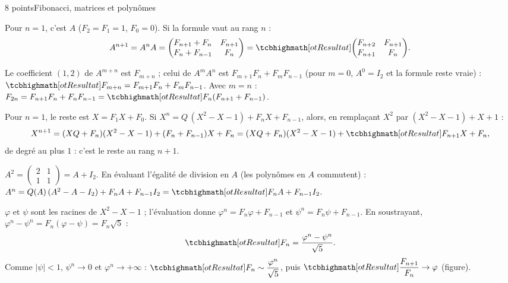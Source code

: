 \begin{corrigeEval}[Problème]{8 points}{Fibonacci, matrices et polynômes}
\begin{questions}
  \item Pour $n=1$, c'est $A$ ($F_2=F_1=1$, $F_0=0$). Si la formule vaut au
    rang $n$ :
    \[A^{n+1}=A^{n}A=\begin{pmatrix}F_{n+1}+F_n&F_{n+1}\\F_n+F_{n-1}&F_n\end{pmatrix}
      =\res{\begin{pmatrix}F_{n+2}&F_{n+1}\\F_{n+1}&F_n\end{pmatrix}}.\]
    \pts{1 pt}
  \item Le coefficient $(1,2)$ de $A^{m+n}$ est $F_{m+n}$ ; celui de
    $A^{m}A^{n}$ est $F_{m+1}F_n+F_mF_{n-1}$ (pour $m=0$, $A^{0}=I_2$ et la
    formule reste vraie) :
    $\res{F_{m+n}=F_{m+1}F_n+F_mF_{n-1}}$. Avec $m=n$ :
    $F_{2n}=F_{n+1}F_n+F_nF_{n-1}=\res{F_n(F_{n+1}+F_{n-1})}$. 
\end{questions}
\begin{questions}[start=3]
  \item Pour $n=1$, le reste est $X=F_1X+F_0$. Si
    $X^{n}=Q\,(X^{2}-X-1)+F_nX+F_{n-1}$, alors, en remplaçant $X^{2}$ par
    $(X^{2}-X-1)+X+1$ :
    \[X^{n+1}=(XQ+F_n)(X^{2}-X-1)+(F_n+F_{n-1})X+F_n
      =(XQ+F_n)(X^{2}-X-1)+\res{F_{n+1}X+F_n},\]
    de degré au plus $1$ : c'est le reste au rang $n+1$. 
  \item $A^{2}=\begin{pmatrix}2&1\\1&1\end{pmatrix}=A+I_2$. En évaluant
    l'égalité de division en $A$ (les polynômes en $A$ commutent) :
    $A^{n}=Q(A)\,(A^{2}-A-I_2)+F_nA+F_{n-1}I_2=\res{F_nA+F_{n-1}I_2}$.
    \pts{1 pt}
  \item $\varphi$ et $\psi$ sont les racines de $X^{2}-X-1$ ; l'évaluation
    donne $\varphi^{n}=F_n\varphi+F_{n-1}$ et $\psi^{n}=F_n\psi+F_{n-1}$. En
    soustrayant, $\varphi^{n}-\psi^{n}=F_n(\varphi-\psi)=F_n\sqrt5$ :
    \[\res{F_n=\frac{\varphi^{n}-\psi^{n}}{\sqrt5}}.\]
    Comme $|\psi|<1$, $\psi^{n}\to0$ et $\varphi^{n}\to+\infty$ :
    $\res{F_n\sim\dfrac{\varphi^{n}}{\sqrt5}}$, puis
    $\res{\dfrac{F_{n+1}}{F_n}\to\varphi}$ (figure). 
\end{questions}
\begin{questions}[start=6]

\end{questions}
\end{corrigeEval}

